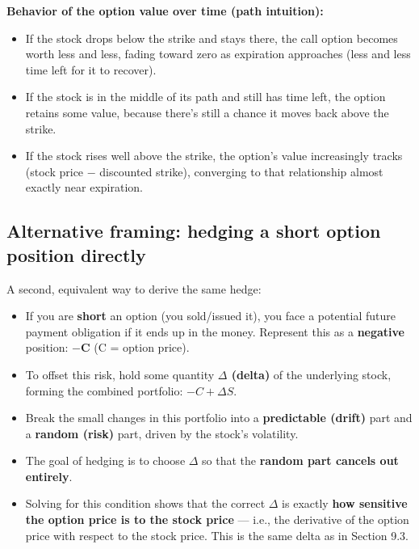 \documentclass[12pt,openany]{book}
\theoremstyle{definition}
\theoremstyle{remark}
\begin{document}
\textbf{Behavior of the option value over time (path intuition):}

\begin{itemize}
\item If the stock drops below the strike and stays there, the call option becomes worth less and less, fading toward zero as expiration approaches (less and less time left for it to recover).


\item If the stock is in the middle of its path and still has time left, the option retains some value, because there's still a chance it moves back above the strike.


\item If the stock rises well above the strike, the option's value increasingly tracks (stock price \(-\) discounted strike), converging to that relationship almost exactly near expiration.


\end{itemize}

\subsection{Alternative framing: hedging a short option position directly}

A second, equivalent way to derive the same hedge:

\begin{itemize}
\item If you are \textbf{short} an option (you sold/issued it), you face a potential future payment obligation if it ends up in the money. Represent this as a \textbf{negative} position: \textbf{\(-\)C} (C = option price).


\item To offset this risk, hold some quantity \textbf{\(\Delta\) (delta)} of the underlying stock, forming the combined portfolio: \(-C+\Delta S\).


\item Break the small changes in this portfolio into a \textbf{predictable (drift)} part and a \textbf{random (risk)} part, driven by the stock's volatility.


\item The goal of hedging is to choose \(\Delta\) so that the \textbf{random part cancels out entirely}.


\item Solving for this condition shows that the correct \(\Delta\) is exactly \textbf{how sensitive the option price is to the stock price} --- i.e., the derivative of the option price with respect to the stock price. This is the same delta as in Section 9.3.


\end{itemize}
\end{document}
